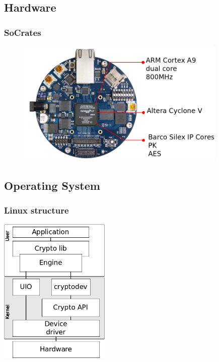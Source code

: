 \documentclass[xcolor={x11names, rgb, usenames, dvipsnames}]{beamer}
\begin{document}
\subsection{Hardware}
\begin{frame}
\frametitle{SoCrates}
	\begin{figure}
	\includegraphics[height=6cm]{socrates-annotated.png}
	\end{figure}
\end{frame}


\subsection{Operating System}
\begin{frame}
\frametitle{Linux structure}
	\begin{center}
	\includegraphics[height=7cm]{os-path-generic.png}
	\end{center}
\end{frame}
\end{document}
